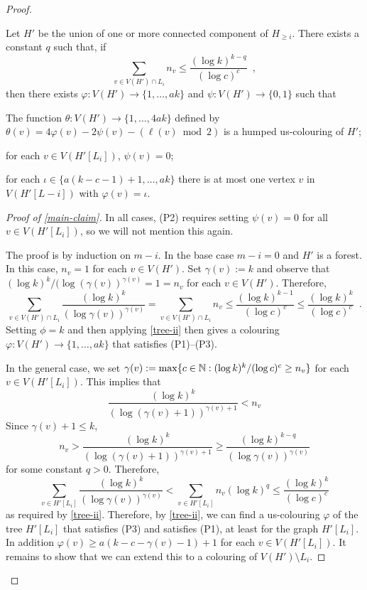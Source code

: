 \documentclass[kpfonts]{patmorin}
\begin{document}
\begin{proof}
    \begin{clm}\label{main-claim}
        Let $H'$ be the union of one or more connected component of $H_{\ge i}$. There exists a constant $q$ such that,  if
        \[
            \sum_{v\in V(H')\cap L_i} n_v\le \frac{(\log k)^{k-q}}{(\log c)^c} \enspace ,
        \]
        then there exists $\varphi:V(H')\to\{1,\ldots,ak\}$ and $\psi:V(H')\to\{0,1\}$ such that
        \begin{compactenum}[(P1)]
            \item The function $\theta:V(H')\to\{1,\ldots,4ak\}$ defined by $\theta(v)=4\varphi(v) - 2\psi(v) -(\ell(v)\bmod 2)$ is a humped us-colouring of $H'$;
            \item for each $v\in V(H'[L_i])$, $\psi(v)=0$;
            \item for each $\iota\in\{a(k-c-1)+1,\ldots,ak\}$ there is at most one vertex $v$ in $V(H'[L-i])$ with $\varphi(v)=\iota$.
        \end{compactenum}
    \end{clm}

    \begin{proof}[Proof of \cref{main-claim}]
        In all cases, (P2) requires setting $\psi(v)=0$ for all $v\in V(H'[L_i])$, so we will not mention this again.

        The proof is by induction on $m-i$. In the base case $m-i=0$ and $H'$ is a forest.  In this case, $n_v=1$ for each $v\in V(H')$.  Set $\gamma(v):=k$ and observe that $(\log k)^k/(\log(\gamma(v))^{\gamma(v)}=1=n_v$ for each $v\in V(H')$. Therefore,
        \[
            \sum_{v\in V(H')\cap L_i} \frac{(\log k)^k}{(\log \gamma(v))^{\gamma(v)}} = \sum_{v\in V(H')\cap L_i} n_v
            \le \frac{(\log k)^{k-1}}{(\log c)^c}
            \le \frac{(\log k)^{k}}{(\log c)^c} \enspace .
        \]
        Setting $\phi=k$ and then applying \cref{tree-ii} then gives a colouring $\varphi: V(H')\to\{1,\ldots,ak\}$ that satisfies (P1)--(P3).

        In the general case, we set $\gamma(v):=\max\{c\in\mathbb{N}:(\log k)^k/(\log c)^c \ge n_v\}$ for each $v\in V(H'[L_i])$.  This implies that
        \[
            \frac{(\log k)^k}{(\log(\gamma(v)+1))^{\gamma(v)+1}} < n_v
        \]
        Since $\gamma(v)+1\le k$,
        \[
           n_v > \frac{(\log k)^k}{(\log(\gamma(v)+1))^{\gamma(v)+1}} \ge
           \frac{(\log k)^{k-q}}{(\log\gamma(v))^{\gamma(v)}}
       \]
       for some constant $q>0$. Therefore,
       \[
           \sum_{v\in H'[L_i]} \frac{(\log k)^k}{(\log \gamma(v))^{\gamma(v)}} < \sum_{v\in H'[L_i]} n_v(\log k)^{q} \le \frac{(\log k)^k}{(\log c)^c}
       \]
       as required by \cref{tree-ii}.  Therefore, by \cref{tree-ii}, we can find a us-colouring $\varphi$ of the tree $H'[L_i]$ that satisfies (P3) and satisfies (P1), at least for the graph $H'[L_i]$. In addition $\varphi(v)\ge a(k-c-\gamma(v)-1)+1$ for each $v\in V(H'[L_i])$.  It remains to show that we can extend this to a colouring of $V(H')\setminus L_i$.


\end{proof}
\end{proof}
\end{document}

